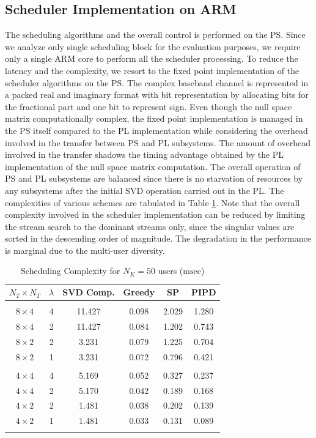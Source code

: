 \documentclass[conference,letterpaper,10pt]{./../../IEEE/IEEEtran}
\begin{document}
\subsection{Scheduler Implementation on ARM}
The scheduling algorithms and the overall control is performed on the PS. Since we analyze only single scheduling block for the evaluation purposes, we require only a single ARM core to perform all the scheduler processing. To reduce the latency and the complexity, we resort to the fixed point implementation of the scheduler algorithms on the PS. The complex baseband channel is represented in a packed real and imaginary format with  bit representation by allocating  bits for the fractional part and one bit to represent sign. Even though the null space matrix computationally complex, the fixed point implementation is managed in the PS itself compared to the PL implementation while considering the overhead involved in the transfer between PS and PL subsystems. The amount of overhead involved in the transfer shadows the timing advantage obtained by the PL implementation of the null space matrix computation. The overall operation of PS and PL subsystems are balanced since there is no starvation of resources by any subsystems after the initial SVD operation carried out in the PL. The complexities of various schemes are tabulated in Table \ref{table:compexity_comparison}. Note that the overall complexity involved in the scheduler implementation can be reduced by limiting the stream search to the dominant streams only, since the singular values are sorted in the descending order of magnitude. The degradation in the performance is marginal due to the multi-user diversity.
\begin{table} \caption{Scheduling Complexity for $N_K = 50$ users ($\mathrm{msec}$)} \begin{center} \begin{tabular}{c c c c c c}
$N_T \times N_T $ & $\lambda$ & SVD Comp. & Greedy   & SP          & PIPD \\ 
\hline \\
$8 \times 4$ & 4 & 11.427 & 0.098 & 2.029 & 1.280 \\ 
$8 \times 4$ & 2 & 11.427 & 0.084 & 1.202 & 0.743 \\
$8 \times 2$ & 2 & 3.231 & 0.079 & 1.225 & 0.704 \\
$8 \times 2$ & 1 & 3.231 & 0.072 & 0.796 & 0.421 \\
\hline \\
$4 \times 4$ & 4 & 5.169 & 0.052 & 0.327 & 0.237 \\ 
$4 \times 4$ & 2 & 5.170 & 0.042 & 0.189 & 0.168 \\
$4 \times 2$ & 2 & 1.481 & 0.038 & 0.202 & 0.139 \\
$4 \times 2$ & 1 & 1.481 & 0.033 & 0.131 & 0.089 \\
\hline \vspace{-0.3in}
\end{tabular} \label{table:compexity_comparison}\end{center}\end{table}
\end{document}
